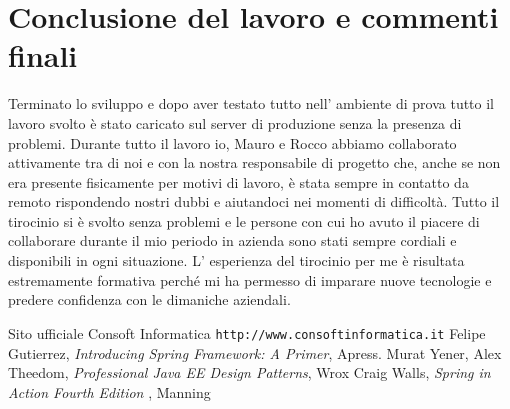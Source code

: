 \documentclass[12pt]{book}
\begin{document}
\chapter{Conclusione del lavoro e commenti finali}
Terminato lo sviluppo e dopo aver testato tutto nell' ambiente di prova tutto 
il lavoro svolto è stato caricato sul server di produzione senza la presenza
di problemi.
Durante tutto il lavoro io, Mauro e Rocco abbiamo collaborato 
attivamente tra di noi e con la nostra responsabile di progetto che, anche
se non era presente fisicamente per motivi di lavoro, è stata sempre in contatto 
da remoto rispondendo nostri dubbi e aiutandoci nei momenti di difficoltà.
Tutto il tirocinio si è svolto senza problemi e le persone con cui ho avuto 
il piacere di collaborare durante il mio periodo in azienda sono stati sempre
cordiali e disponibili in ogni situazione.
L' esperienza del tirocinio per me è risultata estremamente formativa perché
mi ha permesso di imparare nuove tecnologie e predere confidenza con le 
dimaniche aziendali.
\begin{thebibliography}{9}
     Sito ufficiale Consoft Informatica 
    \newline
    \texttt{http://www.consoftinformatica.it}
    Felipe Gutierrez, 
    \emph{Introducing Spring Framework: A Primer}, Apress.
    \newline
    Murat Yener, Alex Theedom,
    \emph{Professional Java EE Design Patterns}, Wrox
    \newline
    Craig Walls,
    \emph{Spring in Action Fourth Edition }, Manning
    \newline
\end{thebibliography}
\end{document}
